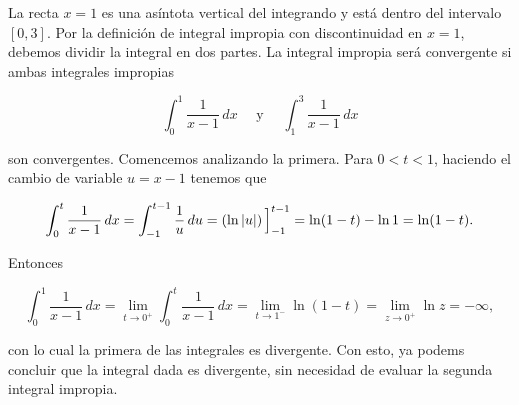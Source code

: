 \documentclass[
  letterpaper,
]{book}
\theoremstyle{plain}
\theoremstyle{remark}
\begin{document}
\begin{tcolorbox}[enhanced jigsaw, opacityback=0, left=2mm, opacitybacktitle=0.6, toprule=.15mm, bottomrule=.15mm, colbacktitle=quarto-callout-tip-color!10!white, titlerule=0mm, bottomtitle=1mm, title=\textcolor{quarto-callout-tip-color}{\faLightbulb}\hspace{0.5em}{Solución}, toptitle=1mm, colframe=quarto-callout-tip-color-frame, colback=white, breakable, rightrule=.15mm, arc=.35mm, leftrule=.75mm, coltitle=black]

La recta \(x=1\) es una asíntota vertical del integrando y está dentro
del intervalo \([0,3]\). Por la definición de integral impropia con
discontinuidad en \(x=1\), debemos dividir la integral en dos partes. La
integral impropia será convergente si ambas integrales impropias

\[
\int_{0}^{1}\frac{1}{x-1}\,dx \quad \text{ y }\quad \int_{1}^{3}\frac{1}{x-1}\,dx
\]

son convergentes. Comencemos analizando la primera. Para \(0<t<1\),
haciendo el cambio de variable \(u=x-1\) tenemos que

\[
\int_{0}^{t}\frac{1}{x-1}\,dx=\int_{-1}^{t-1}\frac{1}{u}\,du=\left(\ln |u|\right)\Big{]}_{-1}^{t-1}=\ln (1-t)-\ln 1=\ln(1-t).
\]

Entonces

\[
\int_{0}^{1}\frac{1}{x-1}\,dx=\lim_{t\to 0^+}\int_{0}^{t}\frac{1}{x-1}\,dx=\lim_{t\to 1^-} \ln (1-t)=\lim_{z\to 0^+}\ln z=-\infty,
\]

con lo cual la primera de las integrales es divergente. Con esto, ya
podems concluir que la integral dada es divergente, sin necesidad de
evaluar la segunda integral impropia.

\end{tcolorbox}
\end{document}
